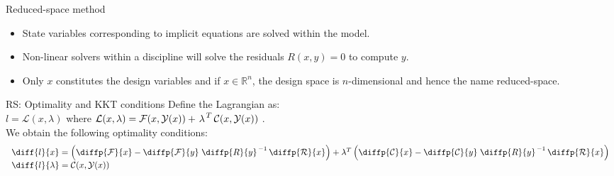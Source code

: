 \documentclass{beamer}
\newcommand{\R}{\mathcal{R}}
\newcommand{\F}{\mathcal{F}}
\newcommand{\C}{\mathcal{C}}
\newcommand{\Y}{\mathcal{Y}}
\newcommand{\Ll}{\mathcal{L}}
\begin{document}
  \begin{frame}{Reduced-space method}
    \vspace{-10mm}
    \begin{itemize}
      \item State variables corresponding to implicit equations are solved within the model.
      \item Non-linear solvers within a discipline will solve the residuals $R(x,y) = 0$ to compute $y$.
      \item Only $x$ constitutes the design variables and if $x \in \mathbb{R}^n$, the design space is $n$-dimensional and hence the name reduced-space.
    \end{itemize}
  \end{frame}

  \begin{frame}{RS: Optimality and KKT conditions}
    \vspace{-5mm}
    Define the Lagrangian as: 
    \vspace{2mm}
    \\ $l = \Ll(x, \lambda)$ where $\Ll(x, \lambda) = \F(x, \Y(x)) + \T{\lambda} \C(x, \Y(x))$ .
    \vspace{2mm}
    \\We obtain the following optimality conditions:
    \vspace{-1mm}
    \begin{equation*} %
        \begin{array}{l}
        \diff{l}{x} 
        = 
        \left( 
            \diffp{\F}{x} - \diffp{\F}{y} \inv{\diffp{R}{y}} \diffp{\R}{x}
        \right)
        + \lambda^T
        \left( 
            \diffp{\C}{x} - \diffp{\C}{y} \inv{\diffp{R}{y}} \diffp{\R}{x} 
        \right) \\
    
        \diff{l}{\lambda} = \C(x,\Y(x))
        
        \end{array}
    \end{equation*}


\end{frame}
\end{document}
